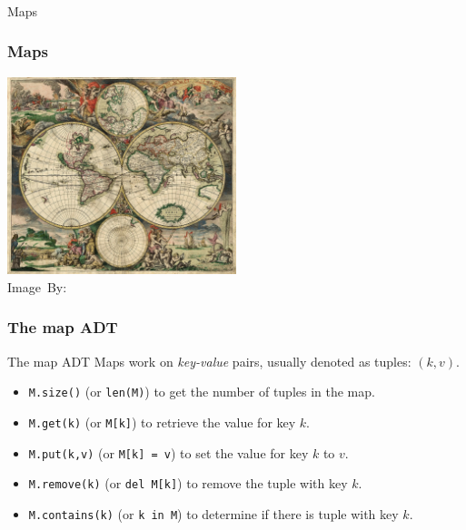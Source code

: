 \begin{frame}[fragile]\frametitle{}
\begin{center}
{\Large Maps}
\end{center}

\end{frame}


\begin{frame}
	\frametitle{Maps}
	
	\begin{center}
		\includegraphics[width=0.5\textwidth]{images/world_map.JPG}\\
		\hspace*{15pt}\hbox{\scriptsize Image By:}
	\end{center}
\end{frame}

\begin{frame}
	\frametitle{The map ADT}
	
		\begin{block}{The map ADT}
			Maps work on \textit{key-value} pairs, usually denoted as tuples: $(k,v)$.
			\pause
			\begin{itemize}
				\item \texttt{M.size()} (or \texttt{len(M)}) to get the number of tuples in the map.
					\pause
				\item \texttt{M.get(k)} (or \texttt{M[k]}) to retrieve the value for key $k$.
				\item \texttt{M.put(k,v)} (or \texttt{M[k] = v}) to set the value for key $k$ to $v$.
					\pause
				\item \texttt{M.remove(k)} (or \texttt{del M[k]}) to remove the tuple with key $k$.
					\pause
				\item \texttt{M.contains(k)} (or \texttt{k in M}) to determine if there is tuple with key $k$.
			\end{itemize}
		\end{block}	
\end{frame}

